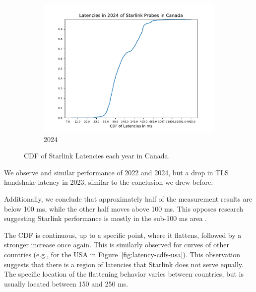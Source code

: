 \begin{figure}
\begin{subfigure}[b]{0.3\linewidth}
		\includegraphics[width=\linewidth]{chapters/4-results/latency/img/cdf_latencies_in_2024_of_starlink_probes_in_canada.pdf}
		\caption{2024}
	\end{subfigure}
	\caption{CDF of Starlink Latencies each year in Canada.}
	\label{fig:latency-cdfs-canada}
\end{figure}

We observe and similar performance of 2022 and 2024, but a drop in TLS
handshake latency in 2023, similar to the conclusion we drew before.

Additionally, we conclude that approximately half of the measurement results
are below 100 ms, while the other half moves above 100 ms. This opposes
research suggesting Starlink performance is mostly in the sub-100 ms area
\cite{DBLP:conf/www/MohanFCBRMO24, DBLP:conf/icnp/LaiLL20,
	DBLP:journals/pacmnet/RamanVCSZ23, DBLP:conf/imc/MichelTGB22}.

The CDF is continuous, up to a specific point, where it flattens, followed by a
stronger increase once again. This is similarly observed for curves of other
countries (e.g., for the USA in Figure~\ref{fig:latency-cdfs-usa}). This
observation suggests that there is a region of latencies that Starlink does not
serve equally. The specific location of the flattening behavior varies between
countries, but is usually located between 150 and 250 ms.

